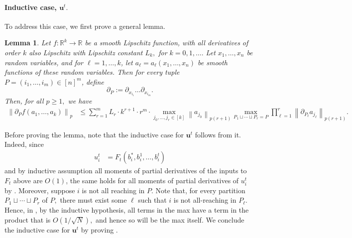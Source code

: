 \documentclass{article}
\newcommand{\1}{\mathbbm{1}}
\newcommand{\norm}[1]{\left\lVert#1\right\rVert}
\theoremstyle{plain}
\newtheorem{lemma}[theorem]{Lemma}
\theoremstyle{definition}
\theoremstyle{remark}
\newcommand{\bfu}{\boldsymbol{u}}
\newcommand{\R}{\mathbb{R}}
\begin{document}
\paragraph{Inductive case, $\bfu^t.$} To address this case, we first prove a general lemma. 
\begin{lemma}\label{lem:chain-rule-expansion}
    Let $f:\R^k \to\R$ be a smooth Lipschitz function, with all derivatives of order $k$ also Lipschitz with Lipschitz constant $L_k,$ for $k=0,1,\dots.$ Let $x_1,\dots,x_n$ be random variables, and for $\ell=1,\dots,k$, let $a_\ell = a_\ell(x_1,\dots,x_n)$ be smooth functions of these random variables. Then for every tuple $P = (i_1,\dots,i_m) \in [n]^m$, define
    \[
    \partial_P := \partial_{x_{i_1}}\dots\partial_{x_{i_m}}.
    \]
    Then, for all $p\geq 1,$ we have
    \begin{align*}
        \norm{\partial_P f(a_1,\dots,a_k)}_p &\leq \sum_{r=1}^m L_r \cdot k^{r+1}\cdot r^m\cdot \max_{j_0,\dots,j_r\in [k]} \norm{a_{j_0}}_{p(r+1)}\max_{P_1\sqcup\cdots\sqcup P_r=P}\prod_{\ell=1}^r\norm{\partial_{P_\ell} a_{j_\ell}}_{p(r+1)}.
    \end{align*}
\end{lemma}
Before proving the lemma, note that the inductive case for $\bfu^t$ follows from it. Indeed, since 
\begin{align*}
u_i^t &= F_t(b_i^*, b_i^1,\dots,b_i^t) 
\end{align*}
and by inductive assumption all moments of partial derivatives of the inputs to $F_t$ above are $O(1)$, the same holds for all moments of partial derivatives of $u^t_i$ by . Moreover, suppose $i$ is not all reaching in $P$. Note that, for every partition $P_1\sqcup\cdots\sqcup P_r$ of $P,$ there must exist some $\ell$ such that $i$ is not all-reaching in $P_\ell.$ Hence, in , by the inductive hypothesis, all terms in the max have a term in the product that is $O( 1/\sqrt{N}),$ and hence so will be the max itself. We conclude the inductive case for $\bfu^t$ by proving .
\end{document}
